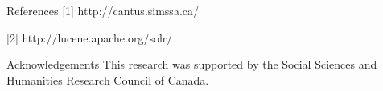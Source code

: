 \documentclass[final]{beamer}
\newcommand{\blockSpace}{\vskip 0.75ex}
\begin{document}
\begin{frame}[fragile,t]
\begin{columns}
\begin{column}{0.47\textwidth}
%
%
%
%

        \begin{block}{References}
        \footnotesize
		[1] http://cantus.simssa.ca/        
        
        [2] http://lucene.apache.org/solr/

%
%
        \end{block}   

        \begin{block}{Acknowledgements}
        \footnotesize
        This research was supported by the Social Sciences and Humanities Research Council of Canada.
        \end{block}

        \end{column}

\begin{column}{0.00\textwidth}
\end{column}
\end{columns}
\end{frame}
\end{document}
